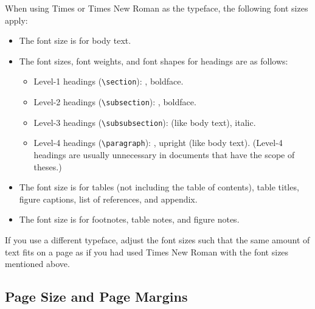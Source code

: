 \documentclass[12pt, a4paper, oneside]{article}
\newlength{\fsLarge}
\newlength{\fslarge}
\newlength{\fsnormal}
\newlength{\fssmall}
\newlength{\fsfootnote}
\theoremstyle{Plain}
\theoremstyle{Definition}
\theoremstyle{Remark}
\begin{document}
When using Times or Times New Roman as the typeface, the following font sizes apply:
\begin{itemize}
	\item The font size is \printlength{\fsnormal} for body text.
	\item The font sizes, font weights, and font shapes for headings are as follows:
		\begin{itemize}
			\item Level-1 headings (\verb|\section|): \printlength{\fsLarge}, boldface.
			\item Level-2 headings (\verb|\subsection|): \printlength{\fslarge}, boldface.
			\item Level-3 headings (\verb|\subsubsection|): \printlength{\fsnormal} (like body text), italic.
			\item Level-4 headings (\verb|\paragraph|): \printlength{\fsnormal}, upright (like body text). (Level-4 headings are usually unnecessary in documents that have the scope of theses.)
		\end{itemize}
	\item The font size is \printlength{\fssmall} for tables (not including the table of contents), table titles, figure captions, list of references, and appendix.
	\item The font size is \printlength{\fsfootnote} for footnotes, table notes, and figure notes.
\end{itemize}

If you use a different typeface, adjust the font sizes such that the same amount of text fits on a page as if you had used Times New Roman with the font sizes mentioned above.

\subsection{Page Size and Page Margins}
\end{document}
